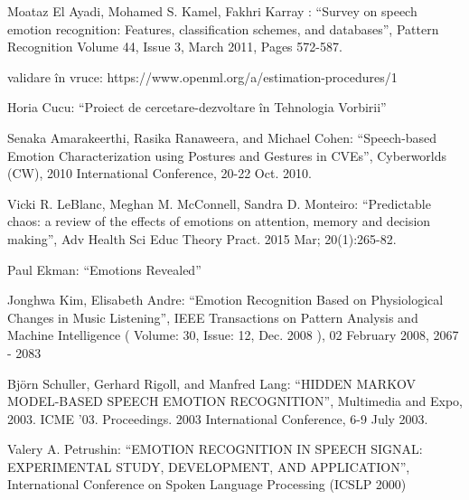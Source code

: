 \documentclass[9pt,shortpaper,twoside,web]{ieeecolor}
\begin{document}
\begin{thebibliography}{00}

 Moataz El Ayadi, Mohamed S. Kamel, Fakhri Karray : ``Survey on speech emotion recognition: Features, classification schemes, and databases'', Pattern Recognition Volume 44, Issue 3, March 2011, Pages 572-587.

 validare în vruce: https://www.openml.org/a/estimation-procedures/1

 Horia Cucu: ``Proiect de cercetare-dezvoltare în Tehnologia Vorbirii''

 Senaka Amarakeerthi, Rasika Ranaweera, and Michael Cohen: ``Speech-based Emotion Characterization using Postures and Gestures in CVEs'', Cyberworlds (CW), 2010 International Conference, 20-22 Oct. 2010.

 Vicki R. LeBlanc, Meghan M. McConnell, Sandra D. Monteiro: ``Predictable chaos: a review of the effects of emotions on attention, memory and decision making'', Adv Health Sci Educ Theory Pract. 2015 Mar; 20(1):265-82.

 Paul Ekman: ``Emotions Revealed''

 Jonghwa Kim, Elisabeth Andre: ``Emotion Recognition Based on Physiological Changes in Music Listening'',  IEEE Transactions on Pattern Analysis and Machine Intelligence ( Volume: 30, Issue: 12, Dec. 2008 ), 02 February 2008, 2067 - 2083

 Björn Schuller, Gerhard Rigoll, and Manfred Lang: ``HIDDEN MARKOV MODEL-BASED SPEECH EMOTION RECOGNITION'', Multimedia and Expo, 2003. ICME '03. Proceedings. 2003 International Conference,  6-9 July 2003.

 Valery A. Petrushin: ``EMOTION RECOGNITION IN SPEECH SIGNAL:
EXPERIMENTAL STUDY, DEVELOPMENT, AND APPLICATION'', International Conference on Spoken Language Processing (ICSLP 2000)

\end{thebibliography}
\end{document}
